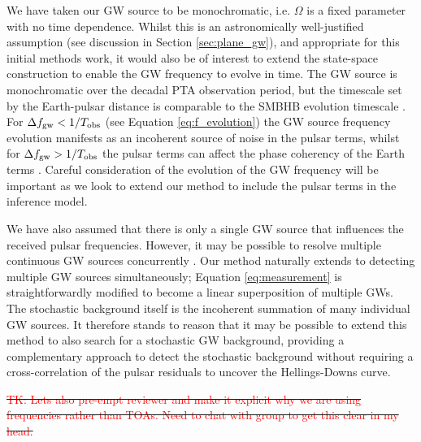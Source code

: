 \documentclass[fleqn,usenatbib,useAMS]{mnras}
\providecommand{\DIFdel}[1]{{\protect\color{red}\sout{#1}}}                      %
\providecommand{\DIFdelbegin}{} %
\newcommand{\DIFscaledelfig}{0.5}
\newlength{\DIFdelgraphicswidth} %
\newlength{\DIFdelgraphicsheight} %
\newcommand{\DIFdelincludegraphics}[2][]{%
\sbox{\DIFdelgraphicsbox}{\DIFOincludegraphics[#1]{#2}}%
\settoboxwidth{\DIFdelgraphicswidth}{\DIFdelgraphicsbox} %
\settoboxtotalheight{\DIFdelgraphicsheight}{\DIFdelgraphicsbox} %
\scalebox{\DIFscaledelfig}{%
\parbox[b]{\DIFdelgraphicswidth}{\usebox{\DIFdelgraphicsbox}\\[-\baselineskip] \rule{\DIFdelgraphicswidth}{0em}}\llap{\resizebox{\DIFdelgraphicswidth}{\DIFdelgraphicsheight}{%
\setlength{\unitlength}{\DIFdelgraphicswidth}%
\begin{picture}(1,1)%
\thicklines\linethickness{2pt} %
{\color[rgb]{1,0,0}\put(0,0){\framebox(1,1){}}}%
{\color[rgb]{1,0,0}\put(0,0){\line( 1,1){1}}}%
{\color[rgb]{1,0,0}\put(0,1){\line(1,-1){1}}}%
\end{picture}%
}\hspace*{3pt}}} %
} %
\DeclareRobustCommand{\DIFdelbegin}{\DIFOdelbegin \let\includegraphics\DIFdelincludegraphics} %
\begin{document}
We have taken our GW source to be monochromatic, i.e. $\Omega$ is a fixed parameter with no time dependence. Whilst this is an astronomically well-justified assumption (see discussion in Section \ref{sec:plane_gw}), and appropriate for this initial methods work, it would also be of interest to extend the state-space construction to enable the GW frequency to evolve in time. The GW source is monochromatic over the decadal PTA observation period, but the timescale set by the Earth-pulsar distance is comparable to the SMBHB evolution timescale \citep{Sesana2010}. For $\Delta f_{\rm gw} < 1 / T_{\rm obs}$ (see Equation \eqref{eq:f_evolution}) the GW source frequency evolution manifests as an incoherent source of noise in the pulsar terms, whilst for  $\Delta f_{\rm gw} > 1 / T_{\rm obs}$ the pulsar terms can affect the phase coherency of the Earth terms \citep{Perrodin2018}. Careful consideration of the evolution of the GW frequency will be important as we look to extend our method to include the pulsar terms in the inference model. \newline 

We have also assumed that there is only a single GW source that influences the received pulsar frequencies. However, it may be possible to resolve multiple continuous GW sources concurrently \citep{PhysRevD.85.044034}. Our method naturally extends to detecting multiple GW sources simultaneously; Equation \eqref{eq:measurement} is straightforwardly modified to become a linear superposition of multiple GWs. The stochastic background itself is the incoherent summation of many individual GW sources. It therefore stands to reason that it may be possible to extend this method to also search for a stochastic GW background, providing a complementary approach to detect the stochastic background without requiring a cross-correlation of the pulsar residuals to uncover the Hellings-Downs curve. \newline 

\DIFdelbegin \DIFdel{\textcolor{red}{TK: Lets also pre-empt reviewer and make it explicit why we are using frequencies rather than TOAs. Need to chat with group to get this clear in my head.}
}%

\end{document}
